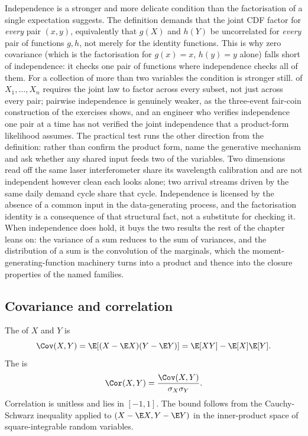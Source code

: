 Independence is a stronger and more delicate condition than the
factorisation of a single expectation suggests. The definition demands
that the joint CDF factor for \emph{every} pair $(x, y)$, equivalently
that $g(X)$ and $h(Y)$ be uncorrelated for \emph{every} pair of
functions $g, h$, not merely for the identity functions. This is why zero
covariance (which is the factorisation for $g(x) = x$, $h(y) = y$ alone)
falls short of independence: it checks one pair of functions where
independence checks all of them. For a collection of more than two
variables the condition is stronger still. 
of $X_{1}, \ldots, X_{n}$ requires the joint law to factor across every
subset, not just across every pair; pairwise independence is genuinely
weaker, as the three-event fair-coin construction of the exercises shows,
and an engineer who verifies independence one pair at a time has not
verified the joint independence that a product-form likelihood assumes.
The practical test runs the other direction from the definition: rather
than confirm the product form, name the generative mechanism and ask
whether any shared input feeds two of the variables. Two dimensions read
off the same laser interferometer share its wavelength calibration and
are not independent however clean each looks alone; two arrival streams
driven by the same daily demand cycle share that cycle. Independence is
licensed by the absence of a common input in the data-generating process,
and the factorisation identity is a consequence of that structural fact,
not a substitute for checking it. When independence does hold, it buys
the two results the rest of the chapter leans on: the variance of a sum
reduces to the sum of variances, and the distribution of a sum is the
convolution of the marginals, which the moment-generating-function
machinery turns into a product and thence into the closure properties of
the named families.

\subsection{Covariance and correlation}

The  of $X$ and $Y$ is
\[
\Cov(X, Y) = \E[(X - \E X)(Y - \E Y)] = \E[XY] - \E[X]\E[Y].
\]
The  is
\[
\Cor(X, Y) = \frac{\Cov(X, Y)}{\sigma_{X} \sigma_{Y}}.
\]
Correlation is unitless and lies in $[-1, 1]$. The bound follows
from the Cauchy-Schwarz inequality applied to $(X - \E X, Y - \E Y)$
in the inner-product space of square-integrable random variables.

